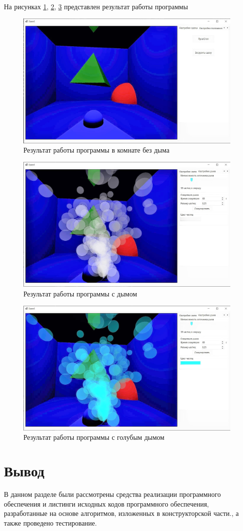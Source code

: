 На рисунках \ref{fig:democlear}, \ref{fig:demosmoke}, \ref{fig:demoblue} представлен результат работы программы 
\begin{figure}[H]
	\centering
	\includegraphics[width=1\linewidth]{inc/img/democlear}
	\caption{Результат работы программы в комнате без дыма}
	\label{fig:democlear}
\end{figure}
\begin{figure}[H]
	\centering
	\includegraphics[width=1\linewidth]{inc/img/demosmoke}
	\caption{Результат работы программы с дымом}
	\label{fig:demosmoke}
\end{figure}
\begin{figure}[H]
	\centering
	\includegraphics[width=1\linewidth]{inc/img/demoblue}
	\caption{Результат работы программы с голубым дымом}
	\label{fig:demoblue}
\end{figure}

\section*{Вывод}

В данном разделе были рассмотрены средства реализации программного обеспечения и листинги исходных кодов программного обеспечения, разработанные на основе алгоритмов, изложенных в конструкторской части., а также проведено тестирование.
